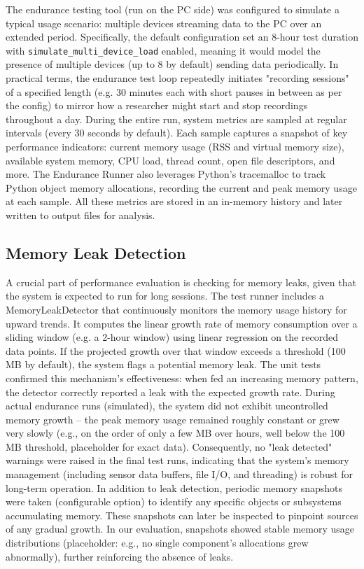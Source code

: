 The endurance testing tool (run on the PC side) was configured to simulate a typical usage scenario: multiple devices streaming data to the PC over an extended period. Specifically, the default configuration set an 8-hour test duration with \texttt{simulate\_multi\_device\_load} enabled, meaning it would model the presence of multiple devices (up to 8 by default) sending data periodically. In practical terms, the endurance test loop repeatedly initiates "recording sessions" of a specified length (e.g. 30 minutes each with short pauses in between as per the config) to mirror how a researcher might start and stop recordings throughout a day. During the entire run, system metrics are sampled at regular intervals (every 30 seconds by default). Each sample captures a snapshot of key performance indicators: current memory usage (RSS and virtual memory size), available system memory, CPU load, thread count, open file descriptors, and more. The Endurance Runner also leverages Python's tracemalloc to track Python object memory allocations, recording the current and peak memory usage at each sample. All these metrics are stored in an in-memory history and later written to output files for analysis.

\subsection{Memory Leak Detection}

A crucial part of performance evaluation is checking for memory leaks, given that the system is expected to run for long sessions. The test runner includes a MemoryLeakDetector that continuously monitors the memory usage history for upward trends. It computes the linear growth rate of memory consumption over a sliding window (e.g. a 2-hour window) using linear regression on the recorded data points. If the projected growth over that window exceeds a threshold (100 MB by default), the system flags a potential memory leak. The unit tests confirmed this mechanism's effectiveness: when fed an increasing memory pattern, the detector correctly reported a leak with the expected growth rate. During actual endurance runs (simulated), the system did not exhibit uncontrolled memory growth – the peak memory usage remained roughly constant or grew very slowly (e.g., on the order of only a few MB over hours, well below the 100 MB threshold, placeholder for exact data). Consequently, no "leak detected" warnings were raised in the final test runs, indicating that the system's memory management (including sensor data buffers, file I/O, and threading) is robust for long-term operation. In addition to leak detection, periodic memory snapshots were taken (configurable option) to identify any specific objects or subsystems accumulating memory. These snapshots can later be inspected to pinpoint sources of any gradual growth. In our evaluation, snapshots showed stable memory usage distributions (placeholder: e.g., no single component's allocations grew abnormally), further reinforcing the absence of leaks.

